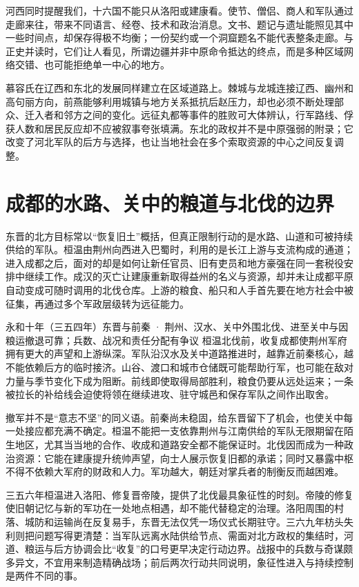 河西同时提醒我们，十六国不能只从洛阳或建康看。使节、僧侣、商人和军队通过走廊来往，带来不同语言、经卷、技术和政治消息。文书、题记与遗址能照见其中一些时间点，却保存得极不均衡；一份契约或一个洞窟题名不能代表整条走廊。与正史并读时，它们让人看见，所谓边疆并非中原命令抵达的终点，而是多种区域网络交错、也可能拒绝单一中心的地方。

慕容氏在辽西和东北的发展同样建立在区域道路上。棘城与龙城连接辽西、幽州和高句丽方向，前燕能够利用城镇与地方关系抵抗后赵压力，却也必须不断处理部众、迁入者和邻方之间的变化。远征丸都等事件的胜败可大体辨认，行军路线、俘获人数和居民反应却不应被叙事夸张填满。东北的政权并不是中原强弱的附录；它改变了河北军队的后方与选择，也让当地社会在多个索取资源的中心之间反复调整。

\section{成都的水路、关中的粮道与北伐的边界}
\label{sec:eastern-jin-depth-campaigns-finance}

东晋的北方目标常以“恢复旧土”概括，但真正限制行动的是水路、山道和可被持续供给的军队。桓温由荆州向西进入巴蜀时，利用的是长江上游与支流构成的通道；进入成都之后，面对的却是如何让新任官员、旧有吏员和地方豪强在同一套税役安排中继续工作。成汉的灭亡让建康重新取得益州的名义与资源，却并未让成都平原自动变成可随时调用的北伐仓库。上游的粮食、船只和人手首先要在地方社会中被征集，再通过多个军政层级转为远征能力。

\begin{event}{}{永和十年（三五四年）}{东晋与前秦 · 荆州、汉水、关中外围}{北伐、进至关中与因粮运撤退可靠；兵数、战况和责任分配有争议}
桓温北伐前，收复成都使荆州军府拥有更大的声望和上游纵深。军队沿汉水及关中道路推进时，越靠近前秦核心，越不能依赖后方的临时接济。山谷、渡口和城市仓储既可能帮助行军，也可能在敌对力量与季节变化下成为阻断。前线即使取得局部胜利，粮食仍要从远处运来；一条被拉长的补给线会迫使将领在继续进攻、驻守城邑和保存军队之间作出取舍。

撤军并不是“意志不坚”的同义语。前秦尚未稳固，给东晋留下了机会，也使关中每一处接应都充满不确定。桓温不能把一支依靠荆州与江南供给的军队无限期留在陌生地区，尤其当当地的合作、收成和道路安全都不能保证时。北伐因而成为一种政治资源：它能在建康提升统帅声望，向士人展示恢复旧都的承诺；同时又暴露中枢不得不依赖大军府的财政和人力。军功越大，朝廷对掌兵者的制衡反而越困难。
\end{event}

三五六年桓温进入洛阳、修复晋帝陵，提供了北伐最具象征性的时刻。帝陵的修复使旧朝记忆与新的军功在一处地点相遇，却不能代替稳定的治理。洛阳周围的村落、城防和运输尚在反复易手，东晋无法仅凭一场仪式长期驻守。三六九年枋头失利则把问题写得更清楚：当军队远离水陆供给节点、需面对北方政权的集结时，河道、粮运与后方协调会比“收复”的口号更早决定行动边界。战报中的兵数与奇谋颇多异文，不宜用来制造精确战场；前后两次行动共同说明，象征性进入与持续控制是两件不同的事。

